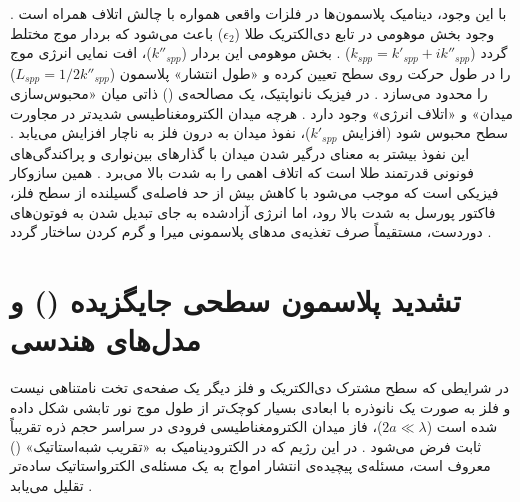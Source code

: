 \documentclass[12pt,a4paper]{report}
\begin{document}
با این وجود، دینامیک پلاسمون‌ها در فلزات واقعی همواره با چالش اتلاف همراه است \cite{maier}. وجود بخش موهومی در تابع دی‌الکتریک طلا ($\epsilon_2$) باعث می‌شود که بردار موج  مختلط گردد ($k_{spp}=k'_{spp}+ik''_{spp}$) \cite{maier}. بخش موهومی این بردار ($k''_{spp}$)، افت نمایی انرژی موج را در طول حرکت روی سطح تعیین کرده و «طول انتشار» پلاسمون ($L_{spp}=1/2k''_{spp}$) را محدود می‌سازد \cite{maier,novotny}. در فیزیک نانواپتیک، یک مصالحه‌ی () ذاتی میان «محبوس‌سازی میدان» و «اتلاف انرژی» وجود دارد \cite{maier,novotny}. هرچه میدان الکترومغناطیسی شدیدتر در مجاورت سطح محبوس شود (افزایش $k'_{spp}$)، نفوذ میدان به درون فلز به ناچار افزایش می‌یابد \cite{maier}. این نفوذ بیشتر به معنای درگیر شدن میدان با گذارهای بین‌نواری و پراکندگی‌های فونونی قدرتمند طلا است که اتلاف اهمی را به شدت بالا می‌برد \cite{maier,novotny}. همین سازوکار فیزیکی است که موجب می‌شود با کاهش بیش از حد فاصله‌ی گسیلنده از سطح فلز، فاکتور پورسل به شدت بالا رود، اما انرژی آزادشده به جای تبدیل شدن به فوتون‌های دوردست، مستقیماً صرف تغذیه‌ی مدهای پلاسمونی میرا و گرم کردن ساختار گردد \cite{novotny,anger}.

\section{تشدید پلاسمون سطحی جایگزیده () و مدل‌های هندسی}
در شرایطی که سطح مشترک دی‌الکتریک و فلز دیگر یک صفحه‌ی تخت نامتناهی نیست و فلز به صورت یک نانوذره با ابعادی بسیار کوچک‌تر از طول موج نور تابشی شکل داده شده است ($2a\ll\lambda$)، فاز میدان الکترومغناطیسی فرودی در سراسر حجم ذره تقریباً ثابت فرض می‌شود \cite{maier,novotny}. در این رژیم که در الکترودینامیک به «تقریب شبه‌استاتیک» () معروف است، مسئله‌ی پیچیده‌ی انتشار امواج به یک مسئله‌ی الکترواستاتیک ساده‌تر تقلیل می‌یابد \cite{maier,novotny}.
\end{document}
